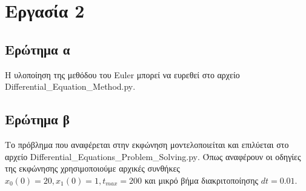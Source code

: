 \documentclass{article}
\begin{document}
\vspace*{\fill}

\newpage
\section{Εργασία 2}

\vspace*{\fill}

\subsection{Ερώτημα α}
Η υλοποίηση της μεθόδου του \foreignlanguage{english}{Euler} μπορεί να ευρεθεί στο αρχείο \foreignlanguage{english}{Differential\_Equation\_Method.py}.
\vspace*{\fill}
\subsection{Ερώτημα β}
Το πρόβλημα που αναφέρεται στην εκφώνηση μοντελοποιείται και επιλύεται στο αρχείο \foreignlanguage{english}{Differential\_Equations\_Problem\_Solving.py}. Όπως αναφέρουν οι οδηγίες της εκφώνησης χρησιμοποιούμε αρχικές συνθήκες $ x_0(0) = 20, x_1(0) = 1, t_{max} = 200 $ και μικρό βήμα διακριτοποίησης $ dt = 0.01 $.
\vspace*{\fill}
\end{document}
